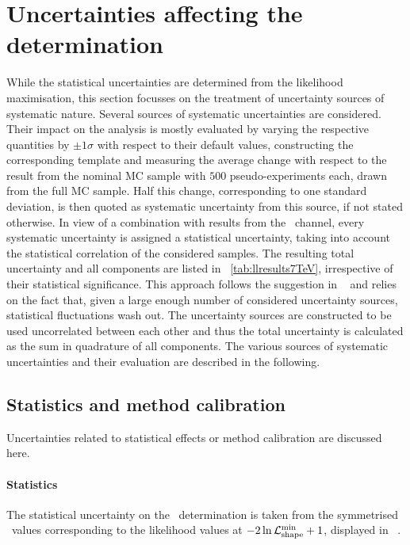 \section{Uncertainties affecting the \mt determination}
\label{sect:unc7TeV}
%
%
While the statistical uncertainties are determined from the likelihood maximisation, this section focusses on the treatment of uncertainty sources of systematic nature.
%
%
Several sources of systematic uncertainties are considered. 
%
Their impact on the analysis is mostly evaluated by varying the respective quantities by $\pm 1 \sigma$ with respect to their default values, constructing the corresponding template and measuring the average \mt change  with respect to the result from the nominal \gls{MC} sample with $500$ pseudo-experiments each, drawn from the full \gls{MC} sample. 
%
Half this \mt change, corresponding to one standard deviation, is then quoted as systematic uncertainty from this source, if not stated otherwise. 
%
In view of a combination with results from the \ttbarlj\ channel, every systematic uncertainty is assigned a statistical uncertainty, taking into account the statistical correlation of the considered samples. 
%
The resulting total uncertainty and all components are listed in \tab~\ref{tab:llresults7TeV}, irrespective of their statistical significance. 
%
This approach follows the suggestion in ~\cite{Barlow:2002yb} and relies on the fact that, given a large enough number of considered uncertainty sources, statistical fluctuations wash out. 
%
The uncertainty sources are constructed to be used uncorrelated between each other and thus the total uncertainty is calculated as the sum in quadrature of all components. 
%
The various sources of systematic uncertainties and their evaluation are described in the following.
%






\subsection{Statistics and method calibration}
%
Uncertainties related to statistical effects or method calibration are discussed here.
%
%
\paragraph{Statistics}\mbox{}
%
The statistical uncertainty on the \mt\ determination is taken from the symmetrised \mt\ values corresponding to the likelihood values at $-2\ln{\Like^\mathrm{min}} + 1$, displayed in \fig~. 
%
